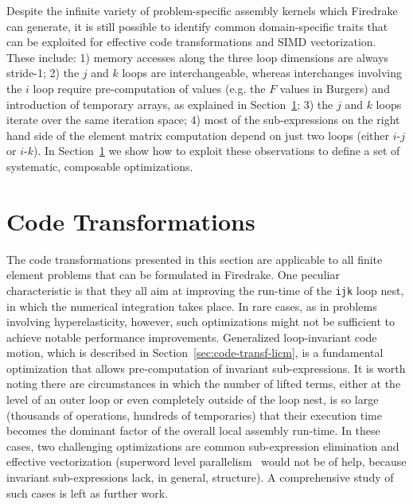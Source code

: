 \documentclass[conference]{IEEEtran}
\begin{document}
Despite the infinite variety of problem-specific assembly kernels which Firedrake can generate, it is still possible to identify common domain-specific traits that can be exploited for effective code transformations and SIMD vectorization. These include: 1) memory accesses along the three loop dimensions are always stride-1; 2) the $j$ and $k$ loops are interchangeable, whereas interchanges involving the $i$ loop require pre-computation of values (e.g. the $F$ values in Burgers) and introduction of temporary arrays, as explained in Section~\ref{sec:code-transf}; 3) the $j$ and $k$ loops iterate over the same iteration space; 4) most of the sub-expressions on the right hand side of the element matrix computation depend on just two loops (either $i$-$j$ or $i$-$k$). In Section~\ref{sec:code-transf} we show how to exploit these observations to define a set of systematic, composable optimizations.


\section{Code Transformations}
\label{sec:code-transf}
The code transformations presented in this section are applicable to all finite element problems that can be formulated in Firedrake. One peculiar characteristic is that they all aim at improving the run-time of the \texttt{ijk} loop nest, in which the numerical integration takes place. In rare cases, as in problems involving hyperelasticity, however, such optimizations might not be sufficient to achieve notable performance improvements. Generalized loop-invariant code motion, which is described in Section~\ref{sec:code-transf-licm}, is a fundamental optimization that allows pre-computation of invariant sub-expressions. It is worth noting there are circumstances in which the number of lifted terms, either at the level of an outer loop or even completely outside of the loop nest, is so large (thousands of operations, hundreds of temporaries) that their execution time becomes the dominant factor of the overall local assembly run-time. In these cases, two challenging optimizations are common sub-expression elimination and effective vectorization (superword level parallelism~\cite{SLP} would not be of help, because invariant sub-expressions lack, in general, structure). A comprehensive study of such cases is left as further work.
\end{document}
